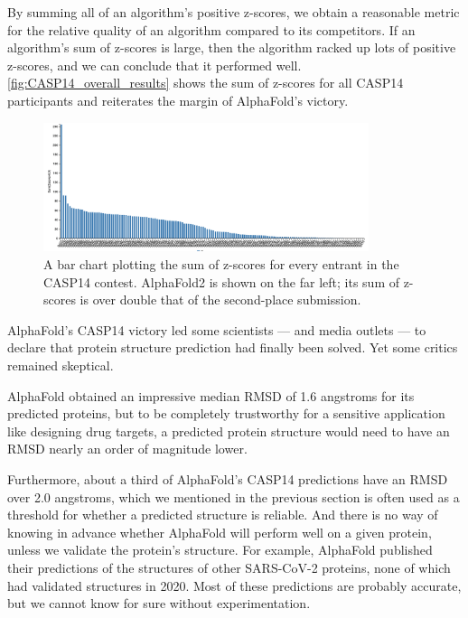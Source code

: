 By summing all of an algorithm's positive z-scores, we obtain a reasonable metric for the relative quality of an algorithm compared to its competitors. If an algorithm's sum of z-scores is large, then the algorithm racked up lots of positive z-scores, and we can conclude that it performed well. \autoref{fig:CASP14_overall_results} shows the sum of z-scores for all CASP14 participants and reiterates the margin of AlphaFold's victory.\\

\begin{figure}[h]
	\centering
	\mySfFamily
	\includegraphics[width = 0.85\textwidth]{../images/CASP14_overall_results.png}
	\caption{A bar chart plotting the sum of z-scores for every entrant in the CASP14 contest. AlphaFold2 is shown on the far left; its sum of z-scores is over double that of the second-place submission.}
	\label{fig:CASP14_overall_results}
\end{figure}

AlphaFold's CASP14 victory led some scientists --- and media outlets --- to declare that protein structure prediction had finally been solved. Yet some critics remained skeptical.

AlphaFold obtained an impressive median RMSD of 1.6 angstroms for its predicted proteins, but to be completely trustworthy for a sensitive application like designing drug targets, a predicted protein structure would need to have an RMSD nearly an order of magnitude lower.

Furthermore, about a third of AlphaFold's CASP14 predictions have an RMSD over 2.0 angstroms, which we mentioned in the previous section is often used as a threshold for whether a predicted structure is reliable. And there is no way of knowing in advance whether AlphaFold will perform well on a given protein, unless we validate the protein's structure. For example, AlphaFold published their predictions of the structures of other SARS-CoV-2 proteins, none of which had validated structures in 2020. Most of these predictions are probably accurate, but we cannot know for sure without experimentation.

